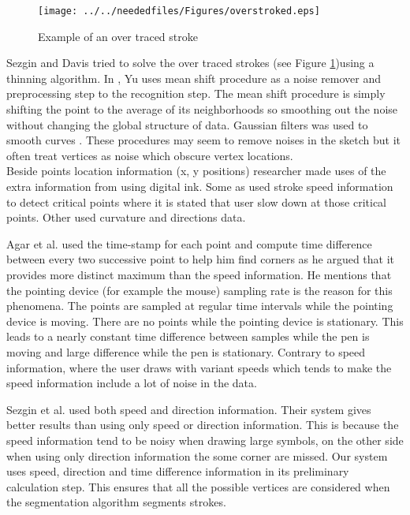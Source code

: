 \begin{figure}
	\centering
		\texttt{[image: ../../neededfiles/Figures/overstroked.eps]}
	\caption[Example of an Over-traced Stroke]{Example of an over traced stroke \cite{overtraced24}}
	\label{fig:overstroked}
\end{figure} 

 Sezgin and Davis \cite{overtraced24} tried to solve the over traced strokes (see Figure \ref {fig:overstroked})using a thinning algorithm. In \cite{meanshift10,domainindependent17}, Yu uses mean shift procedure as a noise remover and preprocessing step to the recognition step. The mean shift procedure is simply shifting the point to the average of its neighborhoods so smoothing out the noise without changing the global structure of data. Gaussian filters was used to smooth curves \cite {Phoenix88}. These procedures may seem to remove noises in the sketch but it often treat vertices as noise which obscure vertex locations. \\
Beside points location information (x, y positions) researcher made uses of the extra information from using digital ink. Some as \cite{mulitstroke5,polygonfeedback31} used stroke speed information to detect critical points where it is stated that user slow down at those critical points. Other used curvature and directions data. %

 Agar et al. \cite{polygonfeedback31} used the time-stamp for each point and compute time difference between every two successive point to help him find corners as he argued that it provides more distinct maximum than the speed information. He mentions that the pointing device (for example the mouse) sampling rate is the reason for this phenomena. The points are sampled at regular time intervals while the pointing device is moving. There are no points while the pointing device is stationary. This leads to a nearly constant time difference between samples while the pen is moving and large difference while the pen is stationary. Contrary to speed information, where the user draws with variant speeds which tends to make the speed information include a lot of noise in the data.
  
Sezgin et al.\cite{earlyprocess} used both speed and direction information. Their system gives better results than using only speed or direction information. This is because the speed information tend to be noisy when drawing large symbols, on the other side when using only direction information the some corner are missed. Our system uses speed, direction and time difference information in its preliminary calculation step. This ensures that all the possible vertices are considered when the segmentation algorithm segments strokes. %
 


